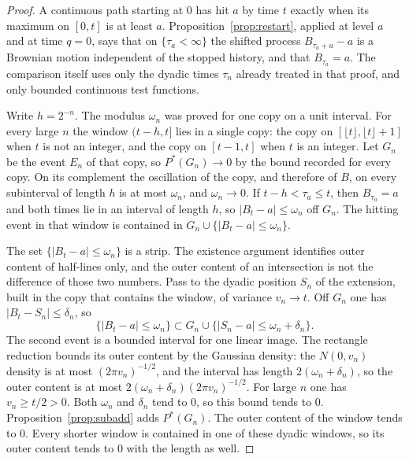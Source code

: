 \begin{proof}
A continuous path starting at $0$ has hit $a$ by time $t$ exactly when its maximum on $[0,t]$ is at least $a$. Proposition~\ref{prop:restart}, applied at level $a$ and at time $q=0$, says that on $\{\tau_a<\infty\}$ the shifted process $B_{\tau_a+u}-a$ is a Brownian motion independent of the stopped history, and that $B_{\tau_a}=a$. The comparison itself uses only the dyadic times $\tau_n$ already treated in that proof, and only bounded continuous test functions.

Write $h=2^{-n}$. The modulus $\omega_n$ was proved for one copy on a unit interval. For every large $n$ the window $(t-h,t]$ lies in a single copy: the copy on $[\lfloor t\rfloor,\lfloor t\rfloor+1]$ when $t$ is not an integer, and the copy on $[t-1,t]$ when $t$ is an integer. Let $G_n$ be the event $E_n$ of that copy, so $P^*(G_n)\to0$ by the bound recorded for every copy. On its complement the oscillation of the copy, and therefore of $B$, on every subinterval of length $h$ is at most $\omega_n$, and $\omega_n\to0$. If $t-h<\tau_a\le t$, then $B_{\tau_a}=a$ and both times lie in an interval of length $h$, so $|B_t-a|\le\omega_n$ off $G_n$. The hitting event in that window is contained in $G_n\cup\{|B_t-a|\le\omega_n\}$.

The set $\{|B_t-a|\le\omega_n\}$ is a strip. The existence argument identifies outer content of half-lines only, and the outer content of an intersection is not the difference of those two numbers. Pass to the dyadic position $S_n$ of the extension, built in the copy that contains the window, of variance $v_n\to t$. Off $G_n$ one has $|B_t-S_n|\le\delta_n$, so
\[
 \{|B_t-a|\le\omega_n\}
 \subset G_n\cup\{|S_n-a|\le\omega_n+\delta_n\}.
\]
The second event is a bounded interval for one linear image. The rectangle reduction bounds its outer content by the Gaussian density: the $N(0,v_n)$ density is at most $(2\pi v_n)^{-1/2}$, and the interval has length $2(\omega_n+\delta_n)$, so the outer content is at most $2(\omega_n+\delta_n)(2\pi v_n)^{-1/2}$. For large $n$ one has $v_n\ge t/2>0$. Both $\omega_n$ and $\delta_n$ tend to $0$, so this bound tends to $0$. Proposition~\ref{prop:subadd} adds $P^*(G_n)$. The outer content of the window tends to $0$. Every shorter window is contained in one of these dyadic windows, so its outer content tends to $0$ with the length as well.


\end{proof}
